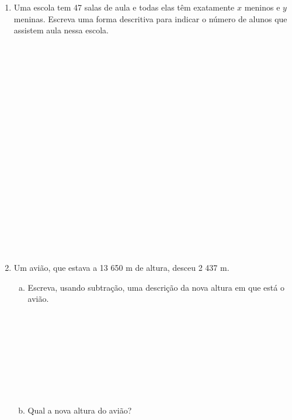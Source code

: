 \documentclass[a4paper,14pt]{article}
\begin{document}
\begin{multicols}{2}
\begin{enumerate}
\begin{enumerate}[a)]
			\end{enumerate}
			\item Uma escola tem 47 salas de aula e todas elas têm exatamente $x$ meninos e $y$ meninas. Escreva uma forma descritiva para indicar o número de alunos que assistem aula nessa escola. \\\\\\\\\\\\\\\\\\\\\\\\\\\\\\\\\\\\\\\\
			\item Um avião, que estava a 13 650 m de altura, desceu 2 437 m.
			\begin{enumerate}[a)]
				\item Escreva, usando subtração, uma descrição da nova altura em que está o avião.  \\\\\\\\\\\\\\\\\\
				\item Qual a nova altura do avião?
			\end{enumerate}
		\end{enumerate}
		$~$ \\ $~$ \\ $~$ \\ $~$ \\ $~$ \\ $~$ \\ $~$ \\ $~$ \\ $~$ \\ $~$ \\ $~$ \\ $~$ \\ $~$ \\ $~$ \\ $~$ \\ $~$ \\ $~$ \\ $~$ \\ $~$ \\ $~$ \\ $~$ \\ $~$ \\ $~$ \\ $~$ \\ $~$
	\end{multicols}
\end{document}
